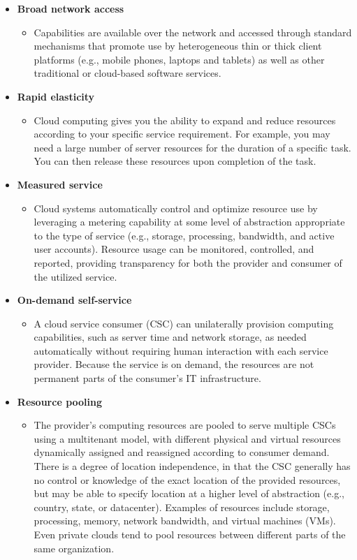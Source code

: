 \begin{itemize}
    \item \textbf{Broad network access}
    \begin{itemize}
        \item Capabilities are available over the network and accessed through standard mechanisms that promote use by heterogeneous thin or thick client platforms (e.g., mobile phones, laptops and tablets) as well as other traditional or cloud-based software services.
    \end{itemize}
    \item \textbf{Rapid elasticity}
    \begin{itemize}
        \item Cloud computing gives you the ability to expand and reduce resources according to your specific service requirement. For example, you may need a large number of server resources for the duration of a specific task. You can then release these resources upon completion of the task.
    \end{itemize}
    \item \textbf{Measured service}
    \begin{itemize}
        \item Cloud systems automatically control and optimize resource use by leveraging a metering capability at some level of abstraction appropriate to the type of service (e.g., storage, processing, bandwidth, and active user accounts). Resource usage can be monitored, controlled, and reported, providing transparency for both the provider and consumer of the utilized service.
    \end{itemize}
    \item \textbf{On-demand self-service}
    \begin{itemize}
        \item A cloud service consumer (CSC) can unilaterally provision computing capabilities, such as server time and network storage, as needed automatically without requiring human interaction with each service provider. Because the service is on demand, the resources are not permanent parts of the consumer's IT infrastructure.
    \end{itemize}
    \item \textbf{Resource pooling}
    \begin{itemize}
        \item The provider's computing resources are pooled to serve multiple CSCs using a multitenant model, with different physical and virtual resources dynamically assigned and reassigned according to consumer demand. There is a degree of location independence, in that the CSC generally has no control or knowledge of the exact location of the provided resources, but may be able to specify location at a higher level of abstraction (e.g., country, state, or datacenter). Examples of resources include storage, processing, memory, network bandwidth, and virtual machines (VMs). Even private clouds tend to pool resources between different parts of the same organization.
    \end{itemize}
\end{itemize}

